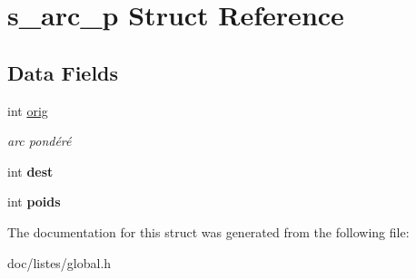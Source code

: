 \hypertarget{structs__arc__p}{}\section{s\+\_\+arc\+\_\+p Struct Reference}
\label{structs__arc__p}
\subsection*{Data Fields}
\begin{DoxyCompactItemize}
\item 
\mbox{\label{structs__arc__p_a9e217f04c0fbbe53b5ad22ba4eb2af25}} 
int \hyperlink{structs__arc__p_a9e217f04c0fbbe53b5ad22ba4eb2af25}{orig}
\begin{DoxyCompactList}\small\item\em arc pondéré \end{DoxyCompactList}\item 
\mbox{\label{structs__arc__p_ae5163ff230abd4115d86194ad89467b5}} 
int {\bfseries dest}
\item 
\mbox{\label{structs__arc__p_ac1abe8fa63a4167cf11ef707f524f0c4}} 
int {\bfseries poids}
\end{DoxyCompactItemize}


The documentation for this struct was generated from the following file\+:\begin{DoxyCompactItemize}
\item 
doc/listes/global.\+h\end{DoxyCompactItemize}
